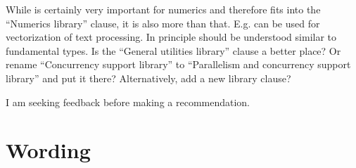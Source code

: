 While  is certainly very important for numerics and therefore fits into the “Numerics library” clause, it is also more than that.
E.g.  can be used for vectorization of text processing.
In principle  should be understood similar to fundamental types.
Is the “General utilities library” clause a better place?
Or rename “Concurrency support library” to “Parallelism and concurrency support library” and put it there?
Alternatively, add a new library clause?

I am seeking feedback before making a recommendation.

\section{Wording}




